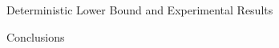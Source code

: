\documentclass[letterpaper,11pt]{paper}
\begin{document}
\begin{section}{Deterministic Lower Bound and Experimental Results}
\label{sec:experiments}

\end{section}

\begin{section}{Conclusions}
\label{sec:conclusions}

\end{section}

\appendix
\label{appendix}

%




\end{document}
